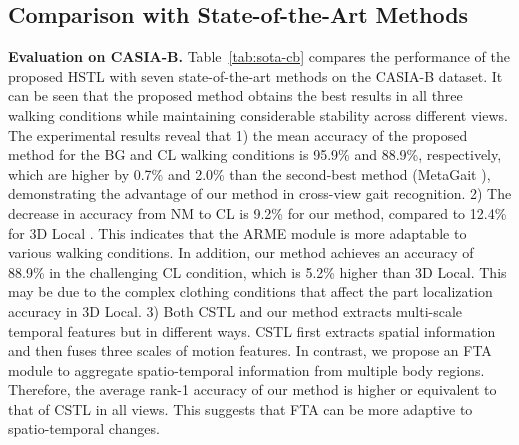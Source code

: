 \documentclass[10pt,twocolumn,letterpaper]{article}
\begin{document}
\subsection{Comparison with State-of-the-Art Methods}
\label{sec:compar}
\noindent\textbf{Evaluation on CASIA-B.} Table~\ref{tab:sota-cb} compares the performance of the proposed HSTL with seven state-of-the-art methods on the CASIA-B dataset. It can be seen that the proposed method obtains the best results in all three walking conditions while maintaining considerable stability across different views. The experimental results reveal that 1) the mean accuracy of the proposed method for the BG and CL walking conditions is 95.9\% and 88.9\%, respectively, which are higher by 0.7\% and 2.0\% than the second-best method (MetaGait \cite{dou2022metagait}),  demonstrating the advantage of our method in cross-view gait recognition. 2)
The decrease in accuracy from NM to CL is 9.2\% for our method, compared to 12.4\% for 3D Local \cite{huang20213d}.
 This indicates that the ARME module is more adaptable to various walking conditions.  In addition, our method achieves an accuracy of 88.9\% in the challenging CL condition, which is 5.2\% higher than 3D Local. This may be due to the complex clothing conditions that affect the part localization accuracy in 3D Local.
 3) Both CSTL \cite{huang2021context} and our method extracts multi-scale temporal features but in different ways. CSTL first extracts spatial information and then fuses three scales of motion features. In contrast, we propose an FTA module to aggregate spatio-temporal information from multiple body regions. Therefore, the average rank-1 accuracy of our method is higher or equivalent to that of CSTL in all views. This suggests that FTA can be more adaptive to spatio-temporal changes.

\end{document}
